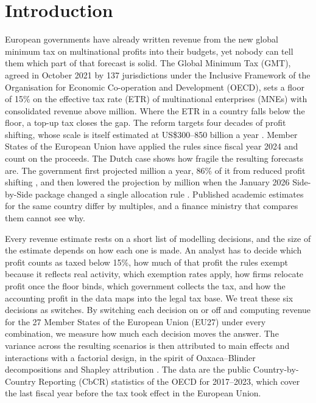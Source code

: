 \documentclass[11pt,a4paper]{article}
\newcommand{\EUR}{\texteuro}
\newcommand{\usd}{US\$}
\begin{document}
\section{Introduction}\label{sec:introduction}

European governments have already written revenue from the new global minimum tax on multinational profits into their budgets, yet nobody can tell them which part of that forecast is solid. The Global Minimum Tax (GMT), agreed in October 2021 by 137 jurisdictions under the Inclusive Framework of the Organisation for Economic Co-operation and Development (OECD), sets a floor of 15\% on the effective tax rate (ETR) of multinational enterprises (MNEs) with consolidated revenue above \EUR750 million. Where the ETR in a country falls below the floor, a top-up tax closes the gap. The reform targets four decades of profit shifting, whose scale is itself estimated at \usd300–850 billion a year \citep{torslov2023,garcia-bernardo2024}. Member States of the European Union have applied the rules since fiscal year 2024 and count on the proceeds. The Dutch case shows how fragile the resulting forecasts are. The government first projected \EUR466 million a year, 86\% of it from reduced profit shifting \citep{36369_3}, and then lowered the projection by \EUR122 million when the January 2026 Side-by-Side package changed a single allocation rule \citep{1028}. Published academic estimates for the same country differ by multiples, and a finance ministry that compares them cannot see why.

Every revenue estimate rests on a short list of modelling decisions, and the size of the estimate depends on how each one is made. An analyst has to decide which profit counts as taxed below 15\%, how much of that profit the rules exempt because it reflects real activity, which exemption rates apply, how firms relocate profit once the floor binds, which government collects the tax, and how the accounting profit in the data maps into the legal tax base. We treat these six decisions as switches. By switching each decision on or off and computing revenue for the 27 Member States of the European Union (EU27) under every combination, we measure how much each decision moves the answer. The variance across the resulting scenarios is then attributed to main effects and interactions with a factorial design, in the spirit of Oaxaca–Blinder decompositions and Shapley attribution \citep{oaxaca1973,blinder1973,shorrocks2013}. The data are the public Country-by-Country Reporting (CbCR) statistics of the OECD for 2017–2023, which cover the last fiscal year before the tax took effect in the European Union.
\end{document}

